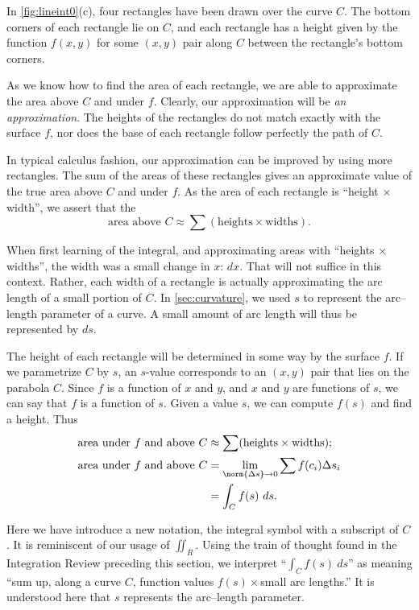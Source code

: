 In \autoref{fig:lineint0}(c), four rectangles have been drawn over the curve $C$. The bottom corners of each rectangle lie on $C$, and each rectangle has a height given by the function $f(x,y)$ for some $(x,y)$ pair along $C$ between the rectangle's bottom corners. 

As we know how to find the area of each rectangle, we are able to approximate the area above $C$ and under $f$. Clearly, our approximation will be \textit{an approximation}. The heights of the rectangles do not match exactly with the surface $f$, nor does the base of each rectangle follow perfectly the path of $C$.

In typical calculus fashion, our approximation can be improved by using more rectangles. The sum of the areas of these rectangles gives an approximate value of the true area above $C$ and under $f$. As the area of each rectangle is ``height $\times$ width'', we assert that the
\[\text{area above $C$}\approx \sum (\text{heights}\times\text{widths}).\]

When first learning of the integral, and approximating areas with ``heights $\times$ widths'', the width was a small change in $x$: $dx$. That will not suffice in this context. Rather, each width of a rectangle is actually approximating the arc length of a small portion of $C$. In \autoref{sec:curvature}, we used $s$ to represent the arc--length parameter of a curve. A small amount of arc length will thus be represented by $ds$. 

The height of each rectangle will be determined in some way by the surface $f$. If we parametrize $C$ by $s$, an $s$-value corresponds to an $(x,y)$ pair that lies on the parabola $C$. Since $f$ is a function of $x$ and $y$, and $x$ and $y$ are functions of $s$, we can say that $f$ is a function of $s$. Given a value $s$, we can compute $f(s)$ and find a height. Thus
\begin{align}
	\text{area under $f$ and above $C$}
	&\approx \sum (\text{heights}\times\text{widths});\notag\\
	\text{area under $f$ and above $C$}
	&=\lim_{\norm{\Delta s}\to0}\sum f(c_i)\Delta s_i\notag\\
	&=\int_Cf(s)\ ds.\label{eq:line0}
\end{align}

Here we have introduce a new notation, the integral symbol with a subscript of $C$. It is reminiscent of our usage of $\iint_R$. Using the train of thought found in the Integration Review preceding this section, we interpret ``$\int_C f(s)\ ds$'' as meaning ``sum up, along a curve $C$, function values $f(s)\times$small arc lengths.'' It is understood here that $s$ represents the arc--length parameter.

